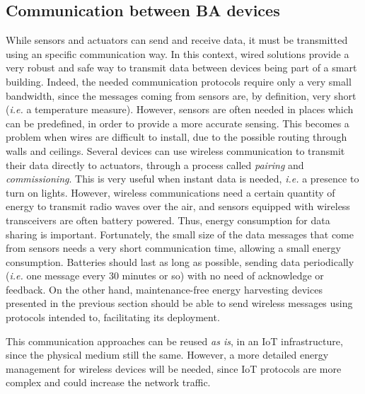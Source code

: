 \subsection{Communication between BA devices}
While sensors and actuators can send and receive data, it must be transmitted using an specific communication way.
In this context, wired solutions provide a very robust and safe way to transmit data between devices being part of a smart building.
Indeed, the needed communication protocols require only a very small bandwidth, since the messages coming from sensors are, by definition, very short (\textit{i.e.} a temperature measure).
However, sensors are often needed in places which can be predefined, in order to provide a more accurate sensing.
This becomes a problem when wires are difficult to install, due to the possible routing through walls and ceilings.
Several devices can use wireless communication to transmit their data directly to actuators, through a process called \textit{pairing} and \textit{commissioning}.
This is very useful when instant data is needed, \textit{i.e.} a presence to turn on lights.
However, wireless communications need a certain quantity of energy to transmit radio waves over the air, and sensors equipped with wireless transceivers are often battery powered.
Thus, energy consumption for data sharing is important.
Fortunately, the small size of the data messages that come from sensors needs a very short communication time, allowing a small energy consumption.
Batteries should last as long as possible, sending data periodically (\textit{i.e.} one message every 30 minutes or so) with no need of acknowledge or feedback.
On the other hand, maintenance-free energy harvesting devices presented in the previous section should be able to send wireless messages using protocols intended to, facilitating its deployment.

This communication approaches can be reused \textit{as is}, in an IoT infrastructure, since the physical medium still the same.
However, a more detailed energy management for wireless devices will be needed, since IoT protocols are more complex and could increase the network traffic.

